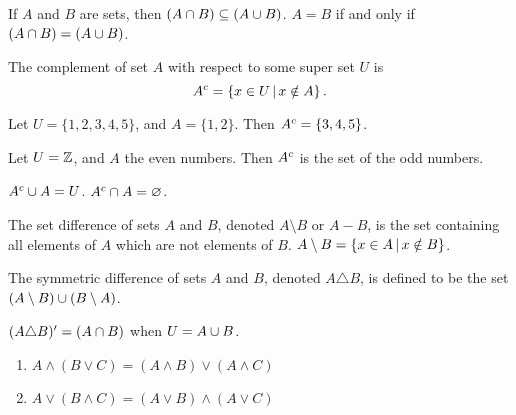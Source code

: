 \begin{rmk}
    If $A$ and $B$ are sets, then $(A \cap B) \subseteq (A \cup B)$. $A = B$ if and only if $(A \cap B) = (A \cup B)$.
\end{rmk}

\begin{defn}
    The complement of set $A$ with respect to some super set $U$ is
    \[A^{c} = \left\{x \in U \,\middle|\, x \notin A\right\}.\]
\end{defn}

\begin{exmp}
    Let $U = \{1, 2, 3, 4, 5\}$, and $A = \{1, 2\}$. Then $A^{c} = \{3, 4, 5\}$.
\end{exmp}

\begin{exmp}
    Let $U = \mathbb{Z}$, and $A$ the even numbers. Then $A^{c}$ is the set of the odd numbers.
\end{exmp}

\begin{rmk}
    $A^{c} \cup A = U$. $A^{c} \cap A = \varnothing$.
\end{rmk}

\begin{defn}\label{set-difference}
    The set difference of sets $A$ and  $B$, denoted $A \setminus B$ or $A - B$, is the set containing all elements of $A$ which are not elements of $B$. $A \setminus B = \left\{x \in A \,\middle|\, x \notin B\right\}$.
\end{defn}

\begin{defn}\label{symmetric-difference}
    The symmetric difference of sets $A$ and $B$, denoted $A \triangle B$, is defined to be the set $(A \setminus B) \cup (B \setminus A)$.
\end{defn}

\begin{rmk}
    $(A \triangle B)' = (A \cap B)$ when $U = A \cup B$.
\end{rmk}

\begin{thm}\label{set-distributive-rule}\proofbreak
    \begin{enumerate}
        \item $A \land (B \lor C) = (A \land B) \lor (A \land C)$
        \item $A \lor (B \land C) = (A \lor B) \land (A \lor C)$
    \end{enumerate}
\end{thm}

